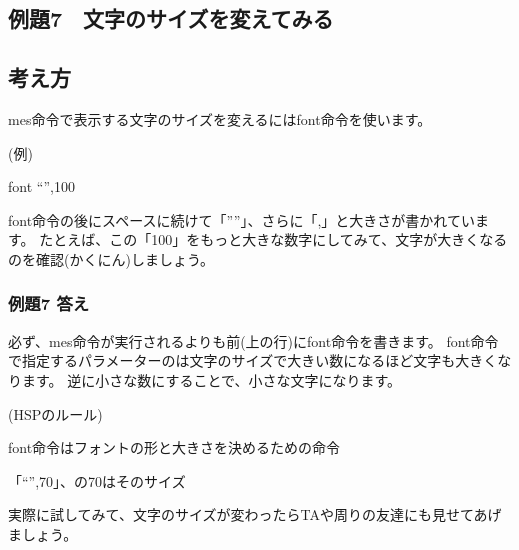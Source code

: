 \clearpage

\subsection{例題7　文字のサイズを変えてみる}

\subsection*{考え方}

mes命令で表示する文字のサイズを変えるにはfont命令を使います。

\begin{description}
    \item (例)
    \item font “”,100
\end{description}

font命令の後にスペースに続けて「””」、さらに「,」と大きさが書かれています。
たとえば、この「100」をもっと大きな数字にしてみて、文字が大きくなるのを確認(かくにん)しましょう。

\subsubsection*{例題7 答え}

必ず、mes命令が実行されるよりも前(上の行)にfont命令を書きます。
font命令で指定するパラメーターのは文字のサイズで大きい数になるほど文字も大きくなります。
逆に小さな数にすることで、小さな文字になります。

\begin{description}
    \item (HSPのルール)
\end{description}

\begin{description}
    \item font命令はフォントの形と大きさを決めるための命令
    \item 「“”,70」、の70はそのサイズ
\end{description}

実際に試してみて、文字のサイズが変わったらTAや周りの友達にも見せてあげましょう。

